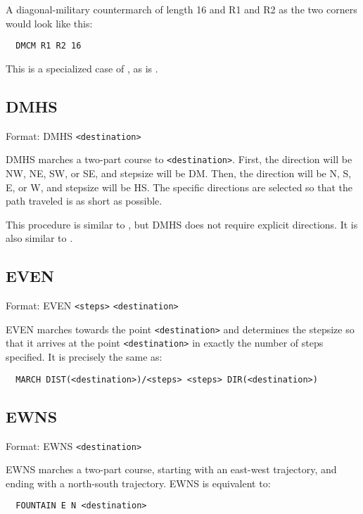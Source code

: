 A diagonal-military countermarch of length 16 and R1 and R2 as the two
corners would look like this:
\begin{verbatim}
  DMCM R1 R2 16
\end{verbatim}

This is a specialized case of , as is
.

\subsection{DMHS}\label{dmhs}

Format: DMHS \verb$<destination>$

DMHS marches a two-part course to \verb$<destination>$.  First, the
direction will be NW, NE, SW, or SE, and stepsize will be DM.  Then,
the direction will be N, S, E, or W, and stepsize will be HS.  The
specific directions are selected so that the path traveled is as short
as possible.

This procedure is similar to , but DMHS does
not require explicit directions.  It is also similar to .

\subsection{EVEN}\label{even}

Format: EVEN \verb$<steps>$ \verb$<destination>$

EVEN marches towards the point \verb$<destination>$ and determines the
stepsize so that it arrives at the point \verb$<destination>$ in exactly
the number of steps specified.  It is precisely the same as:
\begin{verbatim}
  MARCH DIST(<destination>)/<steps> <steps> DIR(<destination>)
\end{verbatim}

\subsection{EWNS}\label{ewns}

Format: EWNS \verb$<destination>$

EWNS marches a two-part course, starting with an east-west trajectory, and
ending with a north-south trajectory.  EWNS is equivalent to:
\begin{verbatim}
  FOUNTAIN E N <destination>
\end{verbatim}

